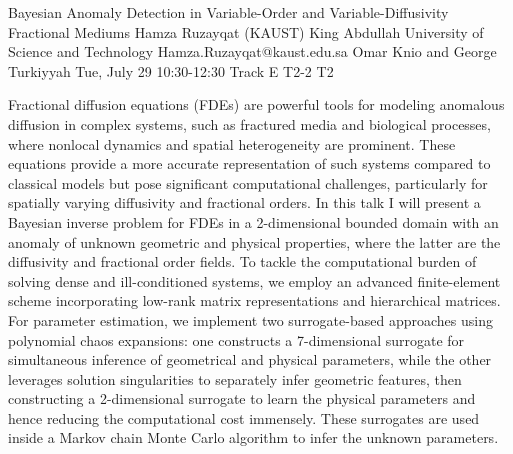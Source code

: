 \begin{talk}
  {Bayesian Anomaly Detection in Variable-Order and Variable-Diffusivity Fractional Mediums}%
  {Hamza Ruzayqat}%
  {(KAUST) King Abdullah University of Science and Technology}%
  {Hamza.Ruzayqat@kaust.edu.sa}%
  {Omar Knio and George Turkiyyah}%
  {}%
  {Tue, July 29 10:30-12:30 Track E}%
  {T2-2}%
  {T2}%
			
Fractional diffusion equations (FDEs) are powerful tools for modeling anomalous diffusion in complex systems, such as fractured media and biological processes, where nonlocal dynamics and spatial heterogeneity are prominent. These equations provide a more accurate representation of such systems compared to classical models but pose significant computational challenges, particularly for spatially varying diffusivity and fractional orders. In this talk I will present a Bayesian inverse problem for FDEs in a 2-dimensional bounded domain with an anomaly of unknown geometric and physical properties, where the latter are the diffusivity and fractional order fields. To tackle the computational burden of solving dense and ill-conditioned systems, we employ an advanced finite-element scheme incorporating low-rank matrix representations and hierarchical matrices. For parameter estimation, we implement two surrogate-based approaches using polynomial chaos expansions: one constructs a 7-dimensional surrogate for simultaneous inference of geometrical and physical parameters, while the other leverages solution singularities to separately infer geometric features, then constructing a 2-dimensional surrogate to learn the physical parameters and hence reducing the computational cost immensely. These surrogates are used inside a Markov chain Monte Carlo algorithm to infer the unknown parameters.

\medskip

\end{talk}

